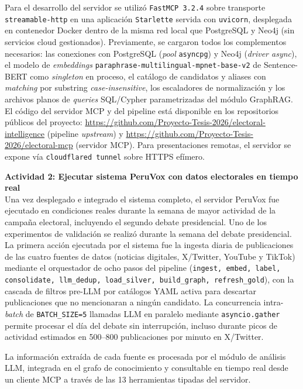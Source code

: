 Para el desarrollo del servidor se utilizó \texttt{FastMCP 3.2.4} sobre transporte
\texttt{streamable-http} en una aplicación \texttt{Starlette} servida con
\texttt{uvicorn}, desplegada en contenedor Docker dentro de la misma red local que
PostgreSQL y Neo4j (sin servicios cloud gestionados). Previamente, se cargaron
todos los complementos necesarios: las conexiones con PostgreSQL (\textit{pool}
\texttt{asyncpg}) y Neo4j (\textit{driver async}), el modelo de \textit{embeddings}
\texttt{paraphrase-multilingual-mpnet-base-v2} de Sentence-BERT como
\textit{singleton} en proceso, el catálogo de candidatos y aliases con
\textit{matching} por substring \textit{case-insensitive}, los escaladores de
normalización y los archivos planos de \textit{queries} SQL/Cypher parametrizadas
del módulo GraphRAG. El código del servidor MCP y del pipeline está disponible en
los repositorios públicos del proyecto:
\url{https://github.com/Proyecto-Tesis-2026/electoral-intelligence} (pipeline
\textit{upstream}) y \url{https://github.com/Proyecto-Tesis-2026/electoral-mcp}
(servidor MCP). Para presentaciones remotas, el servidor se expone vía
\texttt{cloudflared tunnel} sobre HTTPS efímero.

\textbf{Actividad 2: Ejecutar sistema PeruVox con datos electorales en tiempo real}
\\
Una vez desplegado e integrado el sistema completo, el servidor PeruVox fue
ejecutado en condiciones reales durante la semana de mayor actividad de la
campaña electoral, incluyendo el segundo debate presidencial. Uno de los
experimentos de validación se realizó durante la semana del debate
presidencial. La primera acción ejecutada por el sistema fue la ingesta diaria de
publicaciones de las cuatro fuentes de datos (noticias digitales, X/Twitter,
YouTube y TikTok) mediante el orquestador de ocho pasos del pipeline
(\texttt{ingest, embed, label, consolidate, llm\_dedup, load\_silver, build\_graph,
refresh\_gold}), con la cascada de filtros pre-LLM por catálogos YAML activa para
descartar publicaciones que no mencionaran a ningún candidato. La concurrencia
intra-\textit{batch} de \texttt{BATCH\_SIZE=5} llamadas LLM en paralelo mediante
\texttt{asyncio.gather} permite procesar el día del debate sin interrupción,
incluso durante picos de actividad estimados en 500--800 publicaciones por minuto
en X/Twitter.

La información extraída de cada fuente es procesada por el módulo de análisis LLM,
integrada en el grafo de conocimiento y consultable en tiempo real desde un cliente
MCP a través de las 13 herramientas tipadas del servidor.


